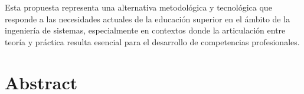 \documentclass[letter,oneside,12pt,spanish]{report}
\begin{document}
{\begin{description}
{\begin{spacing}{1.6}
    Esta propuesta representa una alternativa metodológica y tecnológica que responde a las necesidades actuales de la educación superior en el ámbito de la ingeniería de sistemas, especialmente en contextos donde la articulación entre teoría y práctica resulta esencial para el desarrollo de competencias profesionales.
    \end{spacing}
  }
\end{description}}\normalsize



\newpage

\chapter*{Abstract}
\end{document}
